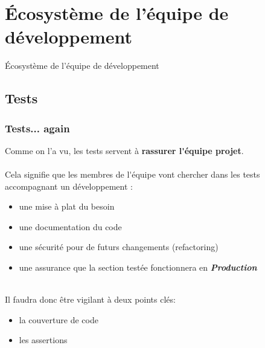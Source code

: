 \section{\'{E}cosyst\`{e}me de l'\'{e}quipe de d\'{e}veloppement}

\begin{frame}
    \begin{center}
    \fontsize{48pt}{7.2}\selectfont
    \'{E}cosyst\`{e}me de l'\'{e}quipe de d\'{e}veloppement
    \end{center}
\end{frame}

\subsection{Tests}
\begin{frame}
	\frametitle{Tests... again}
    Comme on l'a vu, les tests servent \`{a} \textbf{rassurer l\'{}\'{e}quipe projet}.
    \\~\\
    Cela signifie que les membres de l\'{}\'{e}quipe vont chercher dans les tests accompagnant un d\'{e}veloppement :
    \begin{itemize}
        \item une mise \`{a} plat du besoin
        \item une documentation du code
        \item une s\'{e}curit\'{e} pour de futurs changements (refactoring)
        \item une assurance que la section test\'{e}e fonctionnera en \textbf{\textit{Production}}
    \end{itemize}
	~\\
	Il faudra donc \^{e}tre vigilant \`{a} deux points cl\'{e}s:
    \begin{itemize}
        \item la couverture de code
        \item les assertions
    \end{itemize}
\end{frame}

